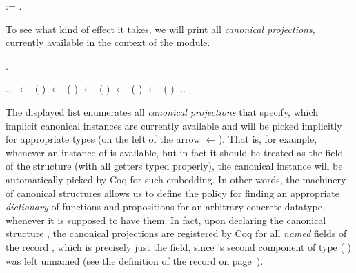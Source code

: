 \begin{coqdoccode}
\coqdocemptyline
\coqdocnoindent
{}  :=   .\coqdoceol
\coqdocemptyline
\end{coqdoccode}


To see what kind of effect it takes, we will print all \textit{canonical
projections}, currently available in the context of the module. 


\begin{coqdoccode}
\coqdocemptyline
\coqdocnoindent
{}  .\coqdoceol
\coqdocemptyline
\end{coqdoccode}


\coqdoceol
\coqdocemptyline
\coqdocnoindent
...\coqdoceol
\coqdocnoindent
{} \ensuremath{\leftarrow}  (  )\coqdoceol
\coqdocnoindent
{} \ensuremath{\leftarrow}  (  )\coqdoceol
\coqdocnoindent
{} \ensuremath{\leftarrow}  (  )\coqdoceol
\coqdocnoindent
{} \ensuremath{\leftarrow}  (  )\coqdoceol
\coqdocnoindent
{} \ensuremath{\leftarrow}  (  )\coqdoceol
\coqdocnoindent
...

\coqdocemptyline


The displayed list enumerates all \textit{canonical projections} that specify,
which implicit canonical instances are currently available and will be
picked implicitly for appropriate types (on the left of the arrow
\ensuremath{\leftarrow}). That is, for example, whenever an instance of  is
available, but in fact it should be treated as the  field of the
 structure (with all getters typed properly), the canonical
instance  will be automatically picked by Coq for such
embedding. In other words, the machinery of canonical structures
allows us to define the policy for finding an appropriate \textit{dictionary}
of functions and propositions for an arbitrary concrete datatype,
whenever it is supposed to have them. In fact, upon declaring the
canonical structure , the canonical projections are
registered by Coq for all \textit{named} fields of the record , which is
precisely just the  field, since 's second component of
type ( ) was left unnamed (see the definition of
the record  on page~\pageref{ref:pack_type}).


